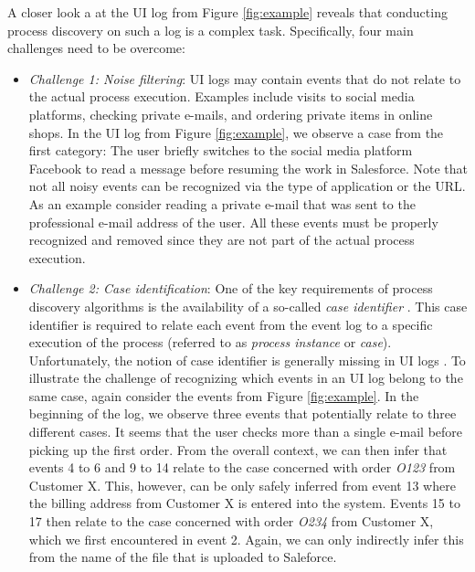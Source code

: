 A closer look a at the UI log from Figure \ref{fig:example} reveals that conducting process discovery on such a log is a complex task. Specifically, four main challenges need to be overcome: 

\begin{itemize}
\item \textit{Challenge 1: Noise filtering}: UI logs may contain events that do not relate to the actual process execution. Examples include visits to social media platforms, checking private e-mails, and ordering private items in online shops. In the UI log from Figure \ref{fig:example}, we observe a case from the first category: The user briefly switches to the social media platform Facebook to read a message before resuming the work in Salesforce. Note that not all noisy events can be recognized via the type of application or the URL. As an example consider reading a private e-mail that was sent to the professional e-mail address of the user. All these events must be properly recognized and removed since they are not part of the actual process execution. 
  
\item \textit{Challenge 2: Case identification}: One of the key requirements of process discovery algorithms is the availability of a so-called \textit{case identifier} \cite{van2016data}. This case identifier is required to relate each event from the event log to a specific execution of the process (referred to as \textit{process instance} or \textit{case}). Unfortunately, the notion of case identifier is generally missing in UI logs \cite{leno2021robotic}. To illustrate the challenge of recognizing which events in an UI log belong to the same case, again consider the events from Figure \ref{fig:example}. In the beginning of the log, we observe three events that potentially relate to three different cases. It seems that the user checks more than a single e-mail before picking up the first order. From the overall context, we can then infer that events 4 to 6 and 9 to 14 relate to the case concerned with order \textit{O123} from Customer X. This, however, can be only safely inferred from event 13 where the billing address from Customer X is entered into the system. Events 15 to 17 then relate to the case concerned with order \textit{O234} from Customer X, which we first encountered in event 2. Again, we can only indirectly infer this from the name of the file that is uploaded to Saleforce. 


\end{itemize}
